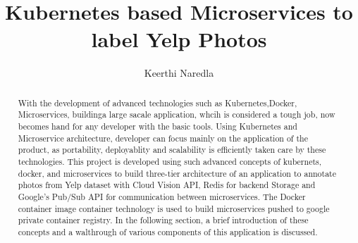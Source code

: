 

\def\paperstatus{60} %
\def\paperchapter{Microservices} %
\def\hid{hid-sp18-602} %
\def\volume{9} %

\def\locator{\hid, Volume: \volume, Chapter: \paperchapter, Status: \paperstatus. \newline}

\title{Kubernetes based Microservices to label Yelp Photos}


\author{Keerthi Naredla}



\renewcommand{\shortauthors}{Keerthi}



\begin{abstract}
  With the development of advanced technologies such as
  Kubernetes,Docker, Microservices, buildinga large sacale
  application, whcih is considered a tough job, now becomes hand for
  any developer with the basic tools. Using Kubernetes and
  Microservice architecture, developer can focus mainly on the
  application of the product, as portability, deployablity and
  scalability is efficiently taken care by these technologies. This
  project is developed using such advanced concepts of kubernets,
  docker, and microservices to build three-tier architecture of an
  application to annotate photos from Yelp dataset with Cloud Vision
  API, Redis for backend Storage and Google’s Pub/Sub API for
  communication between microservices. The Docker container image
  container technology is used to build microservices pushed to google
  private container registry. In the following section, a brief
  introduction of these concepts and a walthrough of various
  components of this application is discussed.
\end{abstract}

